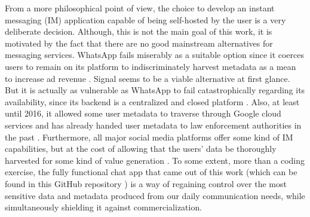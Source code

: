 From a more philosophical point of view, the choice to develop an instant messaging (IM) application capable of being self-hosted by the user is a very deliberate decision. Although, this is not the main goal of this work, it is motivated by the fact that there are no good mainstream alternatives for messaging services. WhatsApp fails miserably as a suitable option since it coerces users to remain on its platform to indiscriminately harvest metadata as a mean to increase ad revenue \cite{Kumar2021}. Signal seems to be a viable alternative at first glance. But it is actually as vulnerable as WhatsApp to fail catastrophically regarding its availability, since its backend is a centralized and closed platform \cite{Hodgson2020}. Also, at least until 2016, it allowed some user metadata to traverse through Google cloud services \cite{Edge2016} and has already handed user metadata to law enforcement authorities in the past \cite{Kaufman2016}. Furthermore, all major social media platforms offer some kind of IM capabilities, but at the cost of allowing that the users' data be thoroughly harvested for some kind of value generation \cite{socialmedia2017}. To some extent, more than a coding exercise, the fully functional chat app that came out of this work (which can be found in this GitHub repository \cite{Rodriguez2022}) is a way of regaining control over the most sensitive data and metadata produced from our daily communication needs, while simultaneously shielding it against commercialization.